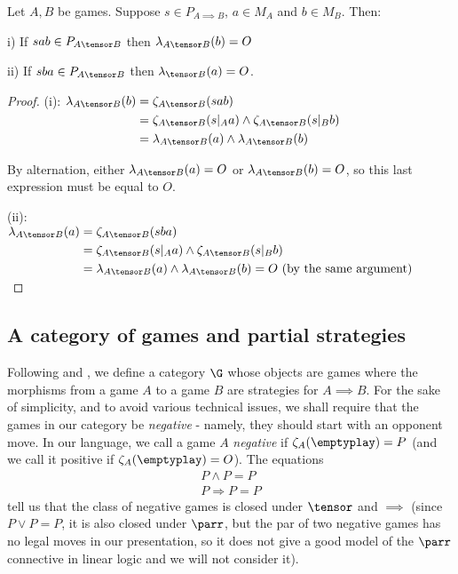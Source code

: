 \documentclass[11pt]{article} %
\begin{document}
\begin{proposition}
  \label{WhoSwitchesGames}
  Let $A,B$ be games.  Suppose $s\in P_{A\implies B}$, $a\in M_A$ and $b\in M_B$.  Then:

  i) If $sab\in P_{A\tensor B}$ then $\lambda_{A\tensor B}(b)=O$

  ii) If $sba\in P_{A\tensor B}$ then $\lambda_{\tensor B}(a)=O$.  

  \begin{proof}

    (i): $\begin{aligned}[t]
      \lambda_{A\tensor B}(b) & = \zeta_{A\tensor B}(sab) \\
       & = \zeta_{A\tensor B}(s\vert_A a) \wedge \zeta_{A\tensor B}(s\vert_B b) \\
       & = \lambda_{A\tensor B}(a) \wedge \lambda_{A\tensor B}(b)
    \end{aligned}$

    By alternation, either $\lambda_{A\tensor B}(a)=O$ or $\lambda_{A\tensor B}(b)=O$, so this last expression must be equal to $O$.
    
    (ii): \noindent$\begin{aligned}[t]
      \lambda_{A\tensor B}(a) & = \zeta_{A\tensor B}(sba) \\
       & = \zeta_{A\tensor B}(s\vert_A a) \wedge \zeta_{A\tensor B}(s\vert_B b) \\
       & = \lambda_{A\tensor B}(a) \wedge \lambda_{A\tensor B}(b) = O\textrm{ (by the same argument)} && \quad\;\qedhere
    \end{aligned}$
  \end{proof}
\end{proposition}

\subsection{A category of games and partial strategies}
\label{CategoricalSemantics}

Following \cite{joyalgames} and \cite{abramskyjagadeesangames}, we define a category $\G$ whose objects are games where the morphisms from a game $A$ to a game $B$ are strategies for $A\implies B$.  For the sake of simplicity, and to avoid various technical issues, we shall require that the games in our category be \emph{negative} - namely, they should start with an opponent move.  In our language, we call a game $A$ \emph{negative} if $\zeta_A(\emptyplay)=P$ (and we call it positive if $\zeta_A(\emptyplay)=O$).  The equations
\begin{gather*}
  P \wedge P = P \\
  P \Rightarrow P = P
\end{gather*}
tell us that the class of negative games is closed under $\tensor$ and $\implies$ (since $P\vee P=P$, it is also closed under $\parr$, but the par of two negative games has no legal moves in our presentation, so it does not give a good model of the $\parr$ connective in linear logic and we will not consider it).
\end{document}
